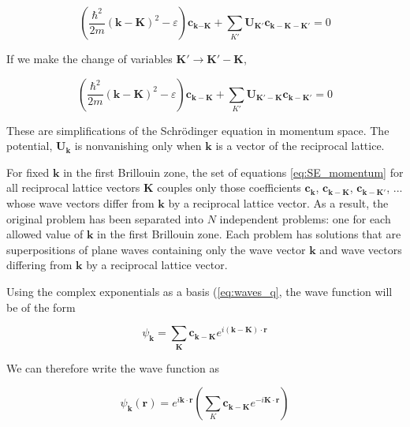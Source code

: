 	\begin{equation} \label{eq:q_2}
		\left(
		\frac{\hbar^2}{2m}
		(\mathbf{k} - \mathbf{K})^2 - \varepsilon
		\right) \boldsymbol{c}_{\mathbf{k {-K}}}
		+ \sum_{K'} \boldsymbol{U}_\mathbf{K'}
		\boldsymbol{c}_\mathbf{k-K-K'}
		= 0
	\end{equation}

	If we make the change of variables  $\mathbf{K'}\rightarrow \mathbf{K'-K}$,

	\begin{equation} \label{eq:SE_momentum}
		\left(
		\frac{\hbar^2}{2m}
		(\mathbf{k-\mathbf{K}})^2 - \varepsilon
		\right) \boldsymbol{c}_{\mathbf{k-K}}
		+ \sum_{K'} \boldsymbol{U}_{\mathbf{K'-K}}
		\boldsymbol{c}_{\mathbf{k-K'}}
		= 0
	\end{equation}

	These are simplifications of the Schrödinger equation in momentum space.  The potential, $\boldsymbol{U}_\mathbf{k}$ is nonvanishing only when $\boldsymbol{k}$ is a vector of the reciprocal lattice.

	For fixed $\mathbf{k}$ in the first Brillouin zone, the set of equations \ref{eq:SE_momentum} for all reciprocal lattice vectors $\mathbf{K}$ couples only those coefficients $\boldsymbol{c}_\mathbf{k}$, $\boldsymbol{c}_\mathbf{k-K}$, $\boldsymbol{c}_\mathbf{k-K'}$, ... whose wave vectors differ from $\mathbf{k}$ by a reciprocal lattice vector. As a result, the original problem has been separated into $N$ independent problems: one for each allowed value of $\mathbf{k}$ in the first Brillouin zone. Each problem has solutions that are superpositions of plane waves containing only the wave vector $\mathbf{k}$ and wave vectors differing from $\mathbf{k}$ by a reciprocal lattice vector. 

	Using the complex exponentials as a basis (\ref{eq:waves_q}, the wave function will be of the form

	\begin{equation} \label{eq:waves_k}
		\psi_{\mathbf{k}}
		= \sum_{\boldsymbol{K}}
		\boldsymbol{c}_{\mathbf{k-K}}
		e^{i(\mathbf{k-K}) \cdot \mathbf{r}}
	\end{equation}

	We can therefore write the wave function as 

	\begin{equation} \label{eq:psi_proof}
		\psi_{\mathbf{k}}(\mathbf{r})
		= e^{i\mathbf{k} \cdot \mathbf{r}}
		\left(\sum_{K} \boldsymbol{c}_{\mathbf{k-K}}
		e^{-i\mathbf{K\cdot r}}
		\right)
	\end{equation}
















